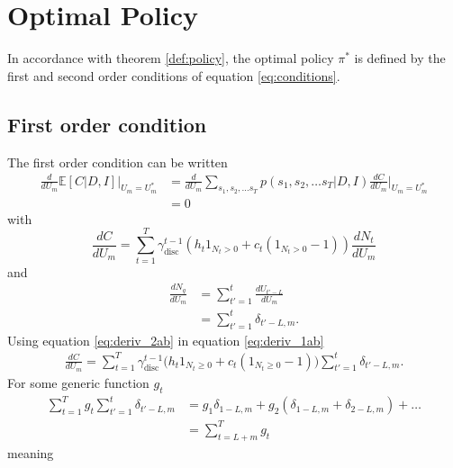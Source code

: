 \section{Optimal Policy}
\label{app:deriva}
In accordance with theorem \ref{def:policy}, the optimal policy $\pi^*$ is defined by the first and second order conditions of equation \eqref{eq:conditions}.

\subsection{First order condition}
The first order condition can be written
\begin{equation}
	\begin{split}
		\frac{d}{dU_m} \mathbb{E}[C | D, I] \Big|_{U_m = U_m^*} &= \frac{d}{dU_m} \sum_{s_1,s_2,\dots s_T}  p(s_1,s_{2},\dots s_T|D,I)\frac{dC}{dU_m}\Big|_{U_m=U_m^*}\\
		&=0
	\end{split}
	\label{eq:cond}
\end{equation}
with
\begin{equation}
		\frac{dC}{dU_m} = \sum_{t=1}^{T} \gamma_{\text{disc}}^{t-1} \left( h_t 1_{N_t> 0} + c_t (1_{N_t> 0}-1) \right)\frac{dN_t}{dU_m}
	\label{eq:deriv_1ab}
\end{equation}
and
\begin{equation}
	\begin{split}
		\frac{dN_q}{dU_m} &= \sum_{t'=1}^t\frac{dU_{t'-L}}{dU_m}\\
		& = \sum_{t'=1}^t\delta_{t'-L,m}.
	\label{eq:deriv_2ab}
	\end{split}
\end{equation}
Using equation \eqref{eq:deriv_2ab} in equation \eqref{eq:deriv_1ab} 
\begin{equation}
	\begin{split}
		\frac{dC}{dU_m} = \sum_{t=1}^{T}\gamma_{\text{disc}}^{t-1}\bigg(h_t1_{N_t\geq 0}+c_t(1_{N_t\geq 0}-1)\bigg)\sum_{t'=1}^t\delta_{t'-L,m}.
	\end{split}
\end{equation}
For some generic function $g_t$
\begin{equation}
	\begin{split}
		\sum_{t=1}^{T}g_t\sum_{t'=1}^t\delta_{t'-L,m} & = g_1\delta_{1-L,m}+g_2(\delta_{1-L,m}+\delta_{2-L,m})+\dots\\
		&=\sum_{t=L+m}^T g_t
	\end{split}
\end{equation}
meaning
